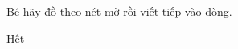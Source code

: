 \documentclass[../main.tex]{subfiles}
\begin{document}
\begin{bt}
    Bé hãy đồ theo nét mờ rồi viết tiếp vào dòng.
    \TTbatdauhinh
    {\centering
    \vspace{3pt}
    \vspace{3pt}
    \vspace{3pt}
    \par}
\end{bt}

\begin{center}
       \faGg\faGg\quad Hết \quad\faGg\faGg
\end{center}
\end{document}
